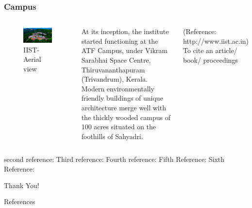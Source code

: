 \documentclass[hyperref={bookmarks=false},aspectratio=169]{beamer}
\begin{document}
\begin{frame}
\frametitle{Campus}

\begin{columns}


\begin{figure}
    \centering
    \includegraphics[width=\columnwidth]{./figures/iist}
    \caption{IIST- Aerial view}
    \label{fig:hollywood_prank}
\end{figure}


At its inception, the institute started functioning at the ATF Campus, under Vikram Sarabhai Space Centre, Thiruvananthapuram (Trivandrum), Kerala. Modern environmentally friendly buildings of unique architecture merge well with the thickly wooded campus of 100 acres situated on the foothills of Sahyadri.

\small{(Reference: http://www.iist.ac.in)}\\
To cite an article/ book/ proceedings


\end{columns}
\cite{santhosh2021generalized} second reference: \cite{ROMANO201714} Third reference:\cite{ROMANO2017151} Fourth reference: \cite{Strogatz1991} Fifth Reference: \cite{strogatz2004sync} Sixth Reference:\cite{thomson1996theory}
\end{frame}
\begin{thankyouframe}[plain]
	\centering
	\Huge Thank You!
\end{thankyouframe}

\begin{frame}[allowframebreaks]{References}

	
	
	
\end{frame}
\end{document}
